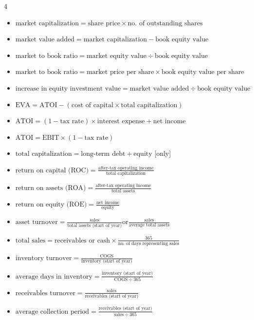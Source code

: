 \documentclass[10pt, landscape]{article}
\begin{document}
\begin{multicols*}{4}
    \begin{itemize}
      \item $\text{market capitalization} = \text{share price} \times \text{no. of outstanding shares}$
      \item $\text{market value added} = \text{market capitalization} - \text{book equity value}$
      \item $\text{market to book ratio} = \text{market equity value} \div \text{book equity value}$
      \item $\text{market to book ratio} = \text{market price per share} \times \text{book equity value per share}$
      \item $\text{increase in equity investment value} = \text{market value added} \div \text{book equity value}$
      \item $\text{EVA} = \text{ATOI} - (\text{cost of capital} \times \text{total capitalization})$
      \item $\text{ATOI} = (1 - \text{tax rate}) \times \text{interest expense} + \text{net income}$
      \item $\text{ATOI} = \text{EBIT} \times (1 - \text{tax rate})$
      \item $\text{total capitalization} = \text{long-term debt} + \text{equity}$ [only]
      \item $\text{return on capital (ROC)} = \frac{\text{after-tax operating income}}{\text{total capitalization}}$
      \item $\text{return on assets (ROA)} = \frac{\text{after-tax operating income}}{\text{total assets}}$
      \item $\text{return on equity (ROE)} = \frac{\text{net income}}{\text{equity}}$
      \item $\text{asset turnover} = \frac{\text{sales}}{\text{total assets (start of year)}} \text{or} \frac{\text{sales}}{\text{average total assets}}$
      \item $\text{total sales} = \text{receivables or cash} \times \frac{365}{\text{no. of days representing sales}}$
      \item $\text{inventory turnover} = \frac{\text{COGS}}{\text{inventory (start of year)}}$
      \item $\text{average days in inventory} = \frac{\text{inventory (start of year)}}{\text{COGS} \div 365}$
      \item $\text{receivables turnover} = \frac{\text{sales}}{\text{receivables (start of year)}}$
      \item $\text{average collection period} = \frac{\text{receivables (start of year)}}{\text{sales} \div 365}$

\end{itemize}
\end{multicols*}
\end{document}
